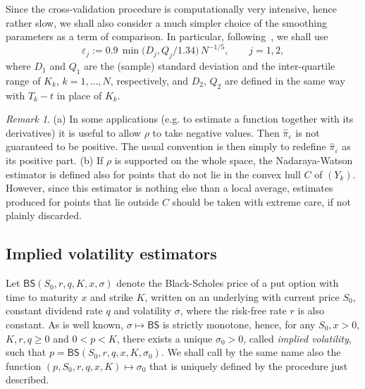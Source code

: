 \documentclass[11pt]{article}
\theoremstyle{remark}
\newtheorem{rmk}[prop]{Remark}
\begin{document}
Since the cross-validation procedure is computationally very
intensive, hence rather slow, we shall also consider a much simpler
choice of the smoothing parameters as a term of comparison. In
particular, following~\cite[\S{3.4.2}]{Silverman}, we shall use
\[
\varepsilon_j := 0.9 \, \min\bigl(D_j,Q_j/1.34\bigr) \, N^{-1/5}, \qquad j=1,2,
\]
where $D_1$ and $Q_1$ are the (sample) standard deviation and the
inter-quartile range of $K_k$, $k=1,\ldots,N$, respectively, and
$D_2$, $Q_2$ are defined in the same way with $T_k-t$ in place of $K_k$.

\begin{rmk}
  (a) In some applications (e.g. to estimate a function together with
  its derivatives) it is useful to allow $\rho$ to take negative
  values. Then $\hat{\pi}_\varepsilon$ is not guaranteed to be
  positive. The usual convention is then simply to redefine
  $\hat{\pi}_\varepsilon$ as its positive part. (b) If $\rho$ is
  supported on the whole space, the Nadaraya-Watson estimator is
  defined also for points that do not lie in the convex hull $C$ of
  $(Y_k)$. However, since this estimator is nothing else than a local
  average, estimates produced for points that lie outside $C$ should
  be taken with extreme care, if not plainly discarded.
\end{rmk}


\subsection{Implied volatility estimators}
\label{ssec:iv}
Let $\mathsf{BS}(S_0,r,q,K,x,\sigma)$ denote the Black-Scholes price of
a put option with time to maturity $x$ and strike $K$, written on an
underlying with current price $S_0$, constant dividend rate $q$ and
volatility $\sigma$, where the risk-free rate $r$ is also constant. As
is well known, $\sigma \mapsto \mathsf{BS}$ is strictly monotone,
hence, for any $S_0,x>0$, $K,r,q \geq 0$ and $0<p<K$, there exists a
unique $\sigma_0>0$, called \emph{implied volatility}, such that
$p=\mathsf{BS}(S_0,r,q,x,K,\sigma_0)$. We shall call by the same name
also the function $(p,S_0,r,q,x,K) \mapsto \sigma_0$ that is uniquely
defined by the procedure just described.
\end{document}
